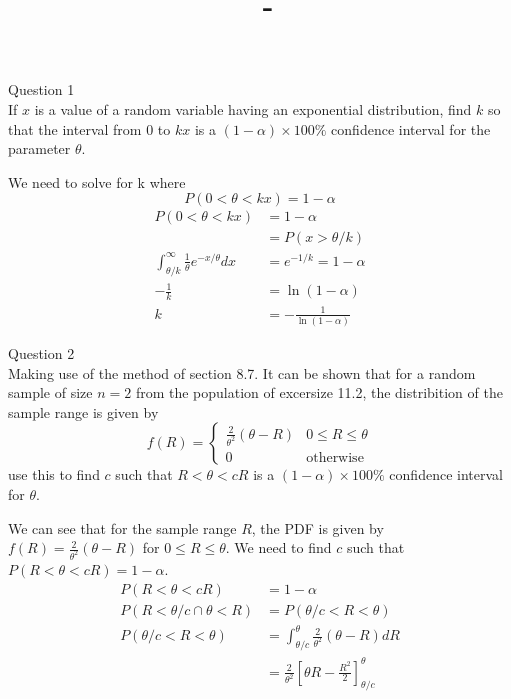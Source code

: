 \documentclass[answers,12pt,addpoints]{exam}
\author{\name}
\title{\course \ - \assignment}
\begin{document}
\maketitle
\begin{questions}
    \question Question 1\\
    If \( x \) is a value of a random variable having an exponential distribution, find \( k \) so that the interval from \( 0 \) to \( kx \) is a \((1 - \alpha) \times 100\%\) confidence interval for the parameter \( \theta \).
    \begin{solution}
    We need to solve for k where 
    $$ P(0 < \theta < kx) = 1 - \alpha$$
    \begin{align*}
        P(0 < \theta < kx) &= 1 - \alpha\\
        &=P(x > \theta / k) \\
        \int_{\theta / k}^{\infty} \frac{1}{\theta} e^{-x/\theta} dx &= e^{-1/k} = 1 - \alpha\\
        -\frac{1}{k} &= \ln(1 - \alpha)\\
        k &= -\frac{1}{\ln(1 - \alpha)}
    \end{align*}
    \end{solution}
    \question Question 2\\
    Making use of the method of section 8.7. It can be shown that for a random sample of size $n=2$ from the population of excersize 11.2, the distribition of the sample range is given by 
    $$ f(R) = \begin{cases}
        \frac{2}{\theta^2}(\theta - R) & 0 \leq R \leq \theta\\
        0 & \text{otherwise}
    \end{cases}$$
    use this to find $c$ such that $R < \theta < cR$ is a $(1 - \alpha) \times 100\%$ confidence interval for $\theta$.
    \begin{solution}
        We can see that for the sample range $R$, the PDF is given by $f(R) = \frac{2}{\theta^2}(\theta - R)$ for $0 \leq R \leq \theta$. We need to find $c$ such that $P(R < \theta < cR) = 1 - \alpha$. 
        \begin{align*}
            P(R < \theta < cR) &= 1 - \alpha\\
            P(R < \theta/c \cap \theta < R) &= P(\theta/c < R < \theta)\\ 
            P(\theta/c < R < \theta) &= \int_{\theta/c}^{\theta} \frac{2}{\theta^2}(\theta - R) dR\\
            &= \frac{2}{\theta^2} \left[ \theta R - \frac{R^2}{2} \right]_{\theta/c}^{\theta}\\

\end{align*}
\end{solution}
\end{questions}
\end{document}
